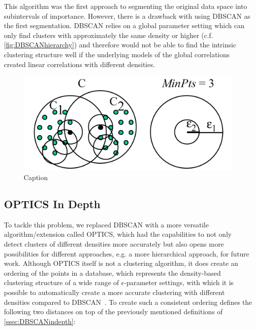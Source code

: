 This algorithm was the first approach to segmenting the original data space into subintervals of importance. However, there is a drawback with using DBSCAN as the first segmentation. DBSCAN relies on a global parameter setting which can only find clusters with approximately the same density or higher (c.f. \autoref{fig:DBSCANhierarchy}) and therefore would not be able to find the intrinsic clustering structure well if the underlying models of the global correlations created linear correlations with different densities. 

\begin{figure}
    \centering
    \includegraphics[width=.5\textwidth]{figures/DBSCANleastdensity.png}
    \caption{Caption ~\cite{opticsankerst1999optics}}
    \label{fig:DBSCANhierarchy}
\end{figure}

\subsection{OPTICS In Depth}\label{ssec:OPTICSindepth} %
To tackle this problem, we replaced DBSCAN with a more versatile algorithm/extension called \acf{OPTICS}, which had the capabilities to not only detect clusters of different densities more accurately but also opens more possibilities for different approaches, e.g. a more hierarchical approach, for future work.
Although \ac{OPTICS} itself is not a clustering algorithm, it does create an ordering of the points in a database, which represents the density-based clustering structure of a wide range of $\epsilon$-parameter settings, with which it is possible to automatically create a more accurate clustering with different densities compared to \ac{DBSCAN}~\cite{opticsankerst1999optics}. To create such a consistent ordering  \citeauthor{opticsankerst1999optics} defines the following two distances on top of the previously mentioned definitions of \autoref{ssec:DBSCANindepth}:
\vspace{5mm}

